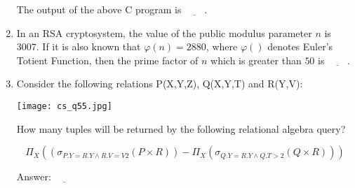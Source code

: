 \documentclass[12pt]{article}
\begin{document}
\begin{enumerate}[label=Q.\arabic*]
The output of the above C program is $\underline{\quad\quad}$.

\item In an RSA cryptosystem, the value of the public modulus parameter $n$ is $3007$. If it is also known that $\varphi(n) = 2880$, where $\varphi()$ denotes Euler's Totient Function, then the prime factor of $n$ which is greater than $50$ is $\underline{\quad\quad}$.

\item Consider the following relations P(X,Y,Z), Q(X,Y,T) and R(Y,V):

	\begin{center}{
			\texttt{[image: cs\_q55.jpg]}}

\end{center}

How many tuples will be returned by the following relational algebra query?

\[
	\Pi_X \left((\sigma_{P.Y = R.Y \land R.V = V2}(P \times R)) - \Pi_X(\sigma_{Q.Y = R.Y \land Q.T > 2}(Q \times R))\right)
\]

Answer: $\underline{\quad\quad}$


\end{enumerate}
\end{document}
